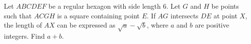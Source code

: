 Let $ABCDEF$ be a regular hexagon with side length $6$. Let $G$ and $H$ be points such that $ACGH$ is a square containing point $E$. If $AG$ intersects $DE$ at point $X$, the length of $AX$ can be expressed as $\sqrt{a} -\sqrt{b}$, where $a$ and $b$ are positive integers. Find $a + b$.
